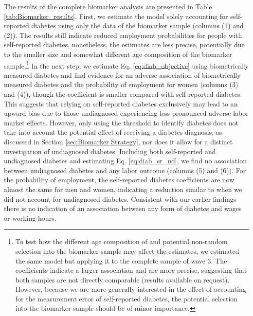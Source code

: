 \documentclass[12pt,english]{article}
\begin{document}
The results of the complete biomarker analysis are presented in Table \ref{tab:Biomarker_results}. First, we estimate the model solely accounting for self-reported diabetes using only the data of the biomarker sample (columns (1) and (2)). The results still indicate reduced employment probabilities for people with self-reported diabetes, nonetheless, the estimates are less precise, potentially due to the smaller size and somewhat different age composition of the biomarker sample.\footnote{To test how the different age composition of and potential non-random selection into the biomarker sample may affect the estimates, we estimated the same model but applying it to the complete sample of wave 3. The coefficients indicate a larger association and are more precise, suggesting that both samples are not directly comparable (results available on request). However, because we are more generally interested in the effect of accounting for the measurement error of self-reported diabetes, the potential selection into the biomarker sample should be of minor importance.}
In the next step, we estimate Eq. \ref{eq:diab_objective} using biometrically measured
diabetes and find evidence for an adverse association of biometrically measured diabetes and the probability of employment for women (columns (3) and (4)), though the coefficient is smaller compared with self-reported diabetes. This suggests that relying on self-reported diabetes exclusively may lead to an upward bias due to those undiagnosed experiencing less pronounced adverse labor market effects. However, only using the threshold to identify diabetes does not take into account the potential effect of receiving a diabetes diagnosis, as discussed in Section \ref{sec:Biomarker Strategy}, nor does it allow for a distinct investigation of undiagnosed diabetes.
Including both self-reported and undiagnosed diabetes and estimating Eq. \ref{eq:diab_sr_ud}, we find no association between undiagnosed diabetes and any labor outcome (columns (5) and (6)). For the probability of employment, the self-reported diabetes coefficients are now almost the same for men and women, indicating a reduction similar to when we did not account for undiagnosed diabetes. Consistent with our earlier findings there is no indication of an association between any form of diabetes and wages or working hours. 
 
\end{document}

